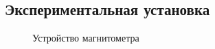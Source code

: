 \documentclass[a4paper, 12pt]{article}
\begin{document}
\subsection*{Экспериментальная установка}
\begin{figure}[h]
	\begin{minipage}[h]{0.5\linewidth}
	\end{minipage}
	\begin{minipage}[h]{0.5\linewidth}
	\end{minipage}
	\caption{Устройство магнитометра}
	\label{ris:station}
\end{figure}
\end{document}
